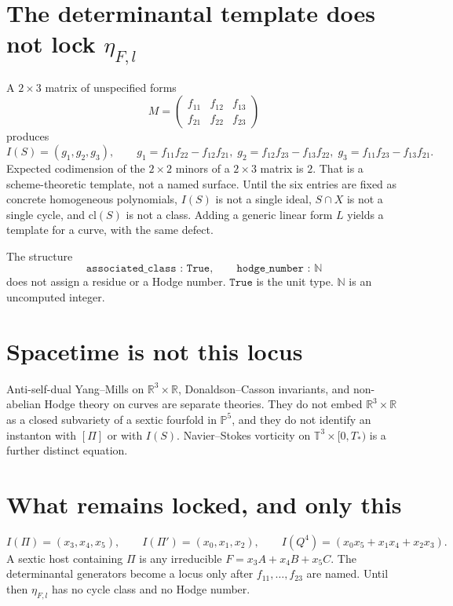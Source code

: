 \documentclass[11pt,a4paper]{article}
\begin{document}
\section{The determinantal template does not lock $\eta_{F,l}$}

A $2\times 3$ matrix of unspecified forms
\[
M=\begin{pmatrix}f_{11}&f_{12}&f_{13}\\ f_{21}&f_{22}&f_{23}\end{pmatrix}
\]
produces
\[
I(S)=(g_1,g_2,g_3),\qquad
g_1=f_{11}f_{22}-f_{12}f_{21},\;
g_2=f_{12}f_{23}-f_{13}f_{22},\;
g_3=f_{11}f_{23}-f_{13}f_{21}.
\]
Expected codimension of the $2\times 2$ minors of a $2\times 3$ matrix is $2$. That is a scheme-theoretic template, not a named surface. Until the six entries are fixed as concrete homogeneous polynomials, $I(S)$ is not a single ideal, $S\cap X$ is not a single cycle, and $\mathrm{cl}(S)$ is not a class. Adding a generic linear form $L$ yields a template for a curve, with the same defect.

The structure
\[
\texttt{associated\_class : True},\qquad \texttt{hodge\_number : $\mathbb{N}$}
\]
does not assign a residue or a Hodge number. $\mathtt{True}$ is the unit type. $\mathbb{N}$ is an uncomputed integer.

\section{Spacetime is not this locus}

Anti-self-dual Yang--Mills on $\mathbb{R}^3\times\mathbb{R}$, Donaldson--Casson invariants, and non-abelian Hodge theory on curves are separate theories. They do not embed $\mathbb{R}^3\times\mathbb{R}$ as a closed subvariety of a sextic fourfold in $\mathbb{P}^5$, and they do not identify an instanton with $[\Pi]$ or with $I(S)$. Navier--Stokes vorticity on $\mathbb{T}^3\times[0,T_*)$ is a further distinct equation.

\section{What remains locked, and only this}

\[
I(\Pi)=(x_3,x_4,x_5),\qquad
I(\Pi')=(x_0,x_1,x_2),\qquad
I(Q^4)=(x_0x_5+x_1x_4+x_2x_3).
\]
A sextic host containing $\Pi$ is any irreducible $F=x_3A+x_4B+x_5C$. The determinantal generators become a locus only after $f_{11},\ldots,f_{23}$ are named. Until then $\eta_{F,l}$ has no cycle class and no Hodge number.
\end{document}
